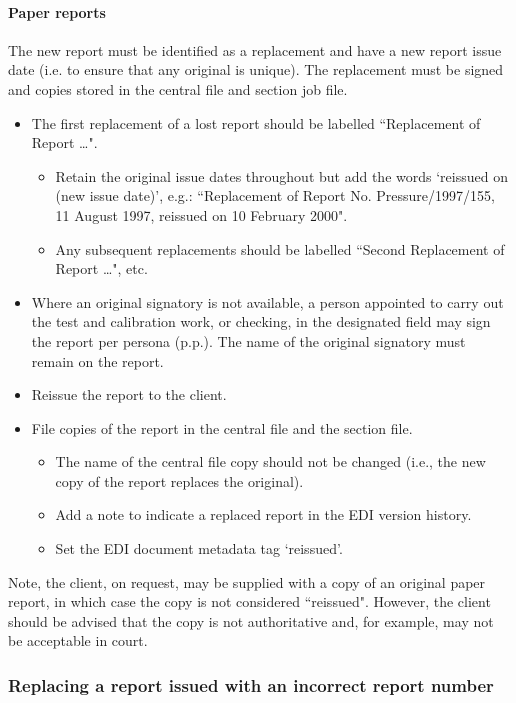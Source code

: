 \paragraph{Paper reports}
The new report must be identified as a replacement and have a new report issue date (i.e. to ensure that any original is unique). The replacement must be signed and copies stored in the central file and section job file. 
\begin{itemize}
\item The first replacement of a lost report should be labelled ``Replacement of Report \ldots". 
\begin{itemize}
\item Retain the original issue dates throughout but add the words `reissued on (new issue date)', e.g.: ``Replacement of Report No. Pressure/1997/155, 11 August 1997, reissued on 10 February 2000".
\item Any subsequent replacements should be labelled ``Second Replacement of Report \ldots", etc.
\end{itemize}

\item Where an original signatory is not available, a person appointed to carry out the test and calibration work, or checking, in the designated field may sign the report per persona (p.p.).  The name of the original signatory must remain on the report.

\item Reissue the report to the client.

\item File copies of the report in the central file and the section file.
\begin{itemize}
\item The name of the central file copy should not be changed (i.e., the new copy of the report replaces the original). 
\item Add a note to indicate a replaced report in the EDI version history.
\item Set the EDI document metadata tag ‘reissued’.
\end{itemize}
\end{itemize}

Note, the client, on request, may be supplied with a copy of an original paper report, in which case the copy is not considered ``reissued". However, the client should be advised that the copy is not authoritative and, for example, may not be acceptable in court.

\subsubsection{Replacing a report issued with an incorrect report number}

